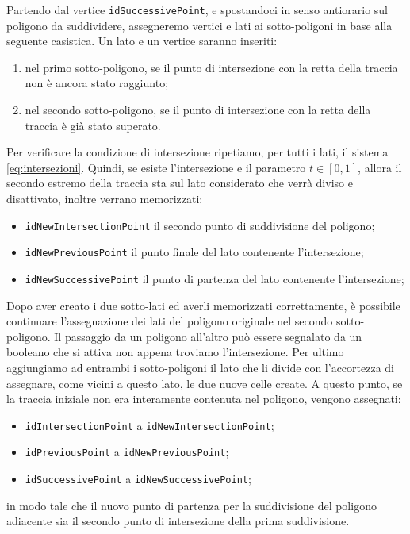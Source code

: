 \documentclass[a4paper]{article}
\begin{document}
Partendo dal vertice \texttt{idSuccessivePoint}, e spostandoci in senso antiorario sul poligono da suddividere, assegneremo vertici e lati ai sotto-poligoni in base alla seguente casistica.
Un lato e un vertice saranno inseriti: 
\begin{enumerate} 
\item nel primo sotto-poligono, se il punto di intersezione con la retta della traccia non è ancora stato raggiunto;
\item nel secondo sotto-poligono, se il punto di intersezione con la retta della traccia è già stato superato.
\end{enumerate}
Per verificare la condizione di intersezione ripetiamo, per tutti i lati, il sistema \eqref{eq:intersezioni}. Quindi, se esiste l'intersezione e il parametro $t \in [0,1]$, allora il secondo estremo della traccia sta sul lato considerato che verrà diviso e disattivato, inoltre verrano memorizzati: 
\begin{itemize} 
\item \texttt{idNewIntersectionPoint} il secondo punto di suddivisione del poligono;
\item \texttt{idNewPreviousPoint} il punto finale del lato contenente l'intersezione;
\item \texttt{idNewSuccessivePoint} il punto di partenza del lato contenente l'intersezione;
\end{itemize}
Dopo aver creato i due sotto-lati ed averli memorizzati correttamente, è possibile continuare l'assegnazione dei lati del poligono originale nel secondo sotto-poligono. Il passaggio da un poligono all'altro può essere segnalato da un booleano che si attiva non appena troviamo l'intersezione. Per ultimo aggiungiamo ad entrambi i sotto-poligoni il lato che li divide con l'accortezza di assegnare, come vicini a questo lato, le due nuove celle create.
A questo punto, se la traccia iniziale non era interamente contenuta nel poligono, vengono assegnati:
\begin{itemize} 
\item \texttt{idIntersectionPoint} a \texttt{idNewIntersectionPoint};
\item \texttt{idPreviousPoint} a \texttt{idNewPreviousPoint};
\item \texttt{idSuccessivePoint} a \texttt{idNewSuccessivePoint};
\end{itemize}
in modo tale che il nuovo punto di partenza per la suddivisione del poligono adiacente sia il secondo punto di intersezione della prima suddivisione.
\end{document}
